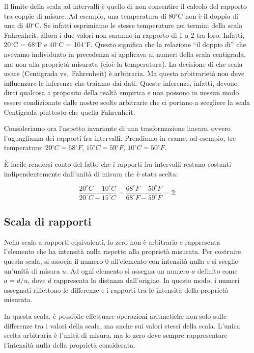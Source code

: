 \documentclass[
  letterpaper,
  DIV=11,
  numbers=noendperiod]{scrreprt}
\theoremstyle{definition}
\theoremstyle{remark}
\begin{document}
Il limite della scala ad intervalli è quello di non consentire il
calcolo del rapporto tra coppie di misure. Ad esempio, una temperatura
di 80\(^\circ\)C non è il doppio di una di 40\(^\circ\)C. Se infatti
esprimiamo le stesse temperature nei termini della scala Fahrenheit,
allora i due valori non saranno in rapporto di 1 a 2 tra loro. Infatti,
20\(^\circ\)C = 68\(^\circ\)F e 40\(^\circ\)C = 104\(^\circ\)F. Questo
significa che la relazione ``il doppio di'' che avevamo individuato in
precedenza si applicava ai numeri della scala centigrada, ma non alla
proprietà misurata (cioè la temperatura). La decisione di che scala
usare (Centigrada vs.~Fahrenheit) è arbitraria. Ma questa arbitrarietà
non deve influenzare le inferenze che traiamo dai dati. Queste
inferenze, infatti, devono dirci qualcosa a proposito della realtà
empirica e non possono in nessun modo essere condizionate dalle nostre
scelte arbitrarie che ci portano a scegliere la scala Centigrada
piuttosto che quella Fahrenheit.

Consideriamo ora l'aspetto invariante di una trasformazione lineare,
ovvero l'uguaglianza dei rapporti fra intervalli. Prendiamo in esame, ad
esempio, tre temperature: \(20^\circ C = 68^\circ F\),
\(15^\circ C = 59^\circ F\), \(10^\circ C = 50 ^\circ F\).

È facile rendersi conto del fatto che i rapporti fra intervalli restano
costanti indipendentemente dall'unità di misura che è stata scelta:

\[
  \frac{20^\circ C - 10^\circ C}{20^\circ C - 15^\circ C} =
  \frac{68^\circ F - 50^\circ F}{68^\circ F-59^\circ F} = 2.
\]

\subsection{Scala di rapporti}\label{scala-di-rapporti}

Nella scala a rapporti equivalenti, lo zero non è arbitrario e
rappresenta l'elemento che ha intensità nulla rispetto alla proprietà
misurata. Per costruire questa scala, si associa il numero 0
all'elemento con intensità nulla e si sceglie un'unità di misura \(u\).
Ad ogni elemento si assegna un numero \(a\) definito come \(a=d/u\),
dove \(d\) rappresenta la distanza dall'origine. In questo modo, i
numeri assegnati riflettono le differenze e i rapporti tra le intensità
della proprietà misurata.

In questa scala, è possibile effettuare operazioni aritmetiche non solo
sulle differenze tra i valori della scala, ma anche sui valori stessi
della scala. L'unica scelta arbitraria è l'unità di misura, ma lo zero
deve sempre rappresentare l'intensità nulla della proprietà considerata.
\end{document}
